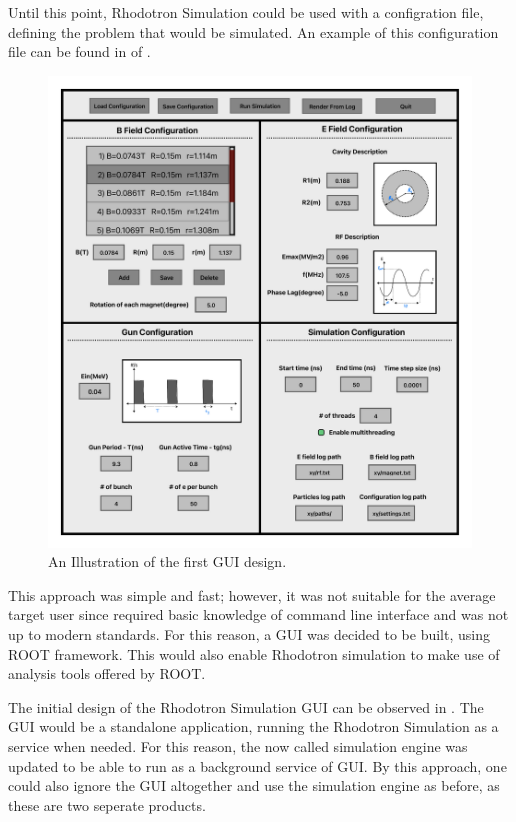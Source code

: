 \documentclass[a4paper,oneside,12pt]{report}
\numberwithin{equation}{chapter}
\begin{document}
{Until this point, Rhodotron Simulation could be used with a configration file, defining the problem that would be simulated.
An example of this configuration file can be found in  of . 
\vspace{10pt}
\begin{figure}[H]
    \centering
    \includegraphics[width=\linewidth]{./figures/illustrations/RhodoSim_GUI_Draft_V02.pdf}
    \caption{An Illustration of the first GUI design.}
    \label{fig:gui_illustration}
\end{figure}
\clearpage
This approach was simple and fast; however, it was not suitable for the average target user since required basic knowledge of command line interface and was not up to modern standards.
For this reason, a GUI was decided to be built, using ROOT framework. 
This would also enable Rhodotron simulation to make use of analysis tools offered by ROOT.

The initial design of the Rhodotron Simulation GUI can be observed in .
The GUI would be a standalone application, running the Rhodotron Simulation as a service when needed. 
For this reason, the now called simulation engine was updated to be able to run as a background service of GUI.
By this approach, one could also ignore the GUI altogether and use the simulation engine as before, as these are two seperate products.

}
\end{document}

